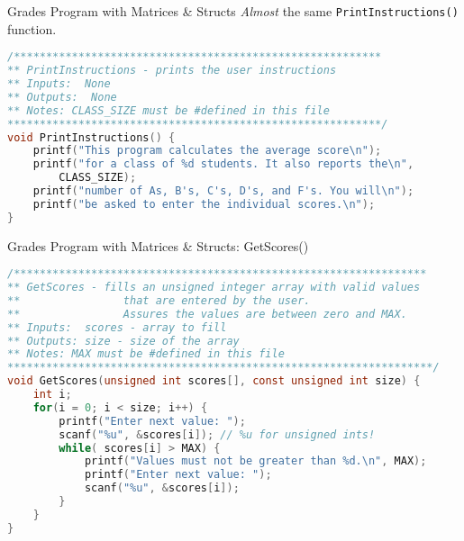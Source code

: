 \documentclass[graphics]{beamer}
\begin{document}
\begin{frame}[fragile]{Grades Program with Matrices \& Structs}
    \textit{Almost} the same \texttt{PrintInstructions()} function.
    \begin{lstlisting}[language=C,basicstyle=\scriptsize,keywordstyle=\color{blue},commentstyle=\color{green},showstringspaces=false,stringstyle=\color{red}]
/*********************************************************
** PrintInstructions - prints the user instructions
** Inputs:  None
** Outputs:  None
** Notes: CLASS_SIZE must be #defined in this file
**********************************************************/
void PrintInstructions() {
    printf("This program calculates the average score\n");
    printf("for a class of %d students. It also reports the\n",
        CLASS_SIZE);
    printf("number of As, B's, C's, D's, and F's. You will\n");
    printf("be asked to enter the individual scores.\n");
}
    \end{lstlisting}
\end{frame}

\begin{frame}[fragile]{Grades Program with Matrices \& Structs: GetScores()}
    \begin{lstlisting}[language=C,basicstyle=\scriptsize,keywordstyle=\color{blue},commentstyle=\color{green},showstringspaces=false,stringstyle=\color{red}]
/****************************************************************
** GetScores - fills an unsigned integer array with valid values
**                that are entered by the user.  
**                Assures the values are between zero and MAX.
** Inputs:  scores - array to fill
** Outputs: size - size of the array
** Notes: MAX must be #defined in this file
******************************************************************/
void GetScores(unsigned int scores[], const unsigned int size) {
    int i;
    for(i = 0; i < size; i++) {
        printf("Enter next value: ");
        scanf("%u", &scores[i]); // %u for unsigned ints!
        while( scores[i] > MAX) {
            printf("Values must not be greater than %d.\n", MAX);
            printf("Enter next value: ");
            scanf("%u", &scores[i]);
        }
    }
}
    \end{lstlisting}
\end{frame}
\end{document}
